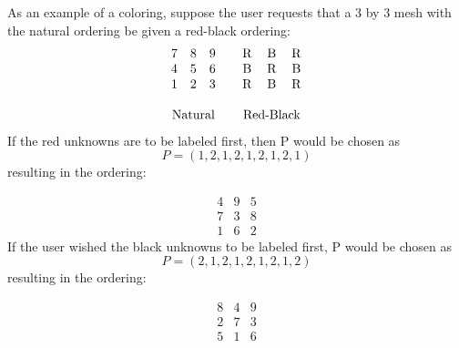 As an example of a coloring, suppose the user requests that a $3$ 
by $3$ mesh with the natural ordering be given a red-black ordering: 
\[
\begin{array}{cc}
    \begin{array}{ccc}
      7 & 8 & 9 \\
      4 & 5 & 6 \\
      1 & 2 & 3
    \end{array} &
    \begin{tabular}{ccc}
      R & B & R \\
      B & R & B \\
      R & B & R
    \end{tabular} \\
       & \\
    \mbox{Natural} & \mbox{Red-Black}
\end{array}
\]
If the red unknowns are to be labeled first, then P would be
chosen as 
\[
    P = ( 1, 2, 1, 2, 1, 2, 1, 2, 1)
\]
resulting in the ordering:
 
\[
\begin{array}{ccc}
    4 & 9 & 5 \\
    7 & 3 & 8 \\
    1 & 6 & 2
\end{array}
\]
If the user wished the black unknowns to be labeled first, P would
be chosen as 
\[
    P = ( 2, 1, 2, 1, 2, 1, 2, 1, 2)
\]
resulting in the ordering:
 
\[
\begin{array}{ccc}
    8 & 4 & 9 \\
    2 & 7 & 3 \\
    5 & 1 & 6
\end{array}
\]
 
